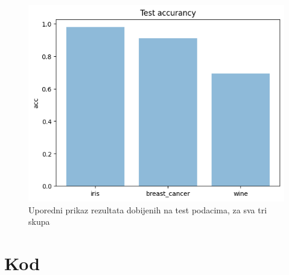 \documentclass[a4paper]{article}
\begin{document}
\begin{figure}[h!]
\centering
\captionsetup{justification=centering,margin=2cm}
\begin{center}
\includegraphics[scale=0.4]{img/test.png}
\end{center}
\caption{Uporedni prikaz rezultata dobijenih na test podacima, za sva tri skupa}
\label{fig:test_appendix}
\end{figure}


\newpage
\section{Kod}
\end{document}
